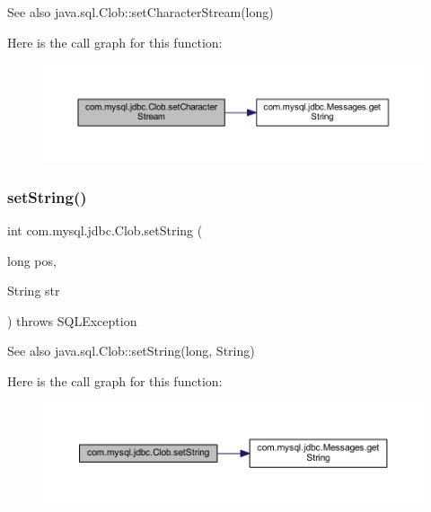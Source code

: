 \begin{DoxySeeAlso}{See also}
java.\+sql.\+Clob\+::set\+Character\+Stream(long) 
\end{DoxySeeAlso}
Here is the call graph for this function\+:\nopagebreak
\begin{figure}[H]
\begin{center}
\leavevmode
\includegraphics[width=350pt]{classcom_1_1mysql_1_1jdbc_1_1_clob_a22d27bf737bec9eae054c624955c767f_cgraph}
\end{center}
\end{figure}
\mbox{\label{classcom_1_1mysql_1_1jdbc_1_1_clob_a6f6ca788351e6699886a355b49c0a583}} 
\subsubsection{\texorpdfstring{set\+String()}{setString()}\hspace{0.1cm}{\footnotesize\ttfamily [1/2]}}
{\footnotesize\ttfamily int com.\+mysql.\+jdbc.\+Clob.\+set\+String (\begin{DoxyParamCaption}\item[{long}]{pos,  }\item[{String}]{str }\end{DoxyParamCaption}) throws S\+Q\+L\+Exception}

\begin{DoxySeeAlso}{See also}
java.\+sql.\+Clob\+::set\+String(long, String) 
\end{DoxySeeAlso}
Here is the call graph for this function\+:\nopagebreak
\begin{figure}[H]
\begin{center}
\leavevmode
\includegraphics[width=350pt]{classcom_1_1mysql_1_1jdbc_1_1_clob_a6f6ca788351e6699886a355b49c0a583_cgraph}
\end{center}
\end{figure}
\mbox{\label{classcom_1_1mysql_1_1jdbc_1_1_clob_a6cee59292b60d8e788a9218940284154}} 
